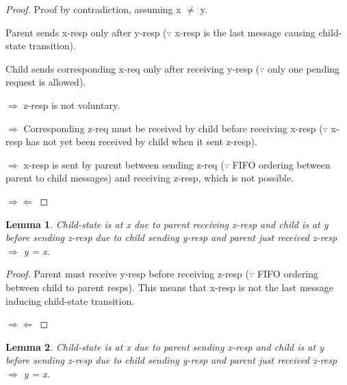 \documentclass{article}
\newtheorem{lemma}{Lemma}
\begin{document}
\begin{proof}

Proof by contradiction, assuming x $\neq$ y.

\begin{figure}
\centering
\end{figure}

Parent sends x-resp only after y-resp ($\because$ x-resp is the last message causing child-state transition).

Child sends corresponding x-req only after receiving y-resp ($\because$ only one pending request is allowed).

$\Rightarrow$ z-resp is not voluntary.

$\Rightarrow$ Corresponding z-req must be received by child before receiving x-resp ($\because$ x-resp has not yet been received by child when it sent z-resp).

$\Rightarrow$ x-resp is sent by parent between sending z-req ($\because$ FIFO ordering between parent to child messages) and receiving z-resp, which is not possible.

$\Rightarrow \Leftarrow$

\end{proof}

\begin{lemma}
Child-state is at x due to parent receiving x-resp and child is at y before sending z-resp due to child sending y-resp and parent just received z-resp $\Rightarrow$ y = x.
\label{CSendPRecvResp}
\end{lemma}

\begin{proof}

Parent must receive y-resp before receiving z-resp ($\because$ FIFO ordering between child to parent resps). This means that x-resp is not the last message inducing child-state transition.

$\Rightarrow \Leftarrow$

\end{proof}

\begin{lemma}
Child-state is at x due to parent sending x-resp and child is at y before sending z-resp due to child sending y-resp and parent just received z-resp $\Rightarrow$ y = x.
\label{CSendPSendResp}
\end{lemma}
\end{document}
